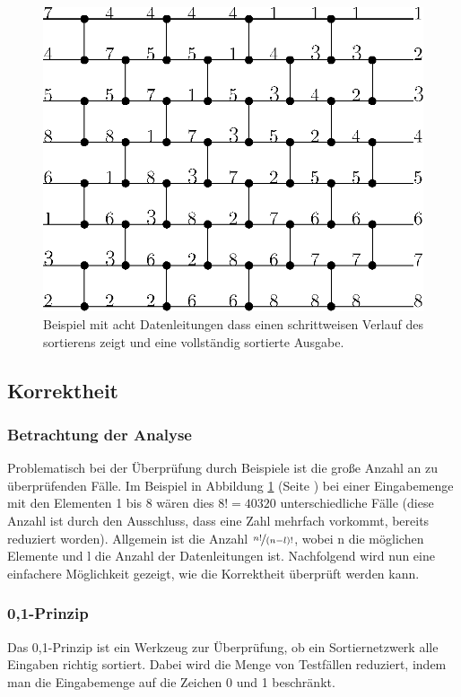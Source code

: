 \documentclass[11pt,ngerman]{article}
\begin{document}
\begin{figure}
\begin{center}
\includegraphics[scale=1]{bild2beispiel.eps}
\caption{Beispiel mit acht Datenleitungen dass einen schrittweisen Verlauf des sortierens zeigt und eine vollständig sortierte Ausgabe.}
\label{fig:kompnetnumbex}
\end{center}
\end{figure}
\subsection{Korrektheit}
\subsubsection{Betrachtung der Analyse}
Problematisch bei der Überprüfung durch Beispiele ist die große Anzahl an zu überprüfenden Fälle. Im Beispiel in Abbildung \ref{fig:kompnetnumbex} (Seite \pageref{fig:kompnetnumbex}) bei einer Eingabemenge mit den Elementen 1 bis 8 wären dies $8! = 40320$ unterschiedliche Fälle (diese Anzahl ist durch den Ausschluss, dass eine Zahl mehrfach vorkommt, bereits reduziert worden). Allgemein ist die Anzahl $\nicefrac{n!}{(n-l)!}$, wobei n die möglichen Elemente und l die Anzahl der Datenleitungen ist. Nachfolgend wird nun eine einfachere Möglichkeit gezeigt, wie die Korrektheit überprüft werden kann.
\subsubsection{0,1-Prinzip}
Das 0,1-Prinzip ist ein Werkzeug zur Überprüfung, ob ein Sortiernetzwerk alle Eingaben richtig sortiert. Dabei wird die Menge von Testfällen reduziert, indem man die Eingabemenge auf die Zeichen 0 und 1 beschränkt.
\end{document}
